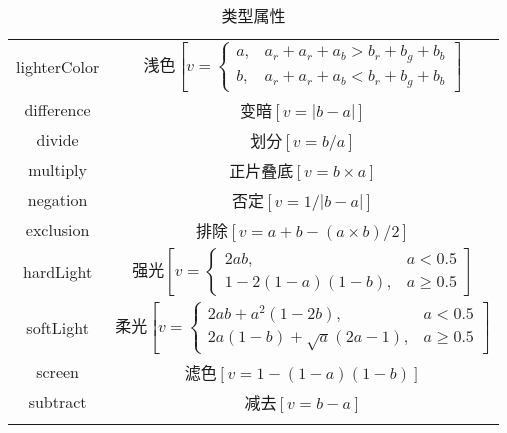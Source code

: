 \begin{longtable}{cc}
lighterColor
    &
浅色$\left[v=\begin{cases}
a, & a_r+a_r+a_b>b_r+b_g+b_b \\
b, & a_r+a_r+a_b<b_r+b_g+b_b
\end{cases}\right]$
    \\

difference
    &
变暗$\left[v=\left|b-a\right|\right]$
    \\

divide
    &
划分$\left[v=b/a\right]$
    \\

multiply
    &
正片叠底$\left[v=b\times{}a\right]$
    \\

negation
    &
否定$\left[v=1/\left|b-a\right|\right]$
    \\

exclusion
    &
排除$\left[v=a+b-(a\times{}b)/2\right]$
    \\

hardLight
    &
强光$\left[v=\begin{cases}
2ab, & a<0.5 \\
1-2(1-a)(1-b), & a\ge{}0.5
\end{cases}\right]$
    \\

softLight
    &
柔光$\left[v=\begin{cases}
2ab+a^2(1-2b), & a<0.5 \\
2a(1-b)+\sqrt{a}(2a-1), & a\ge{}0.5
\end{cases}\right]$
    \\

screen
    &
滤色$\left[v=1-(1-a)(1-b)\right]$
    \\

subtract
    &
减去$\left[v=b-a\right]$
    \\
\bottomrule            %
\caption{类型属性}\label{tb000002} %
\end{longtable}








